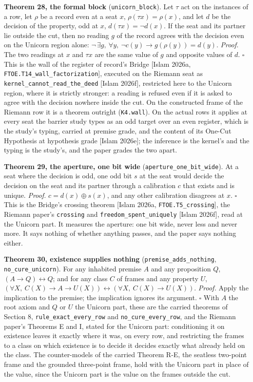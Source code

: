 \documentclass[10pt,twocolumn]{article}
\begin{document}
\textbf{Theorem 28, the formal block} (\texttt{unicorn\_block}). Let
\(\tau\) act on the instances of a row, let \(\rho\) be a record even at
a seat \(x\), \(\rho(\tau x) = \rho(x)\), and let \(d\) be the decision
of the property, odd at \(x\), \(d(\tau x) = \neg d(x)\). If the seat
and its partner lie outside the cut, then no reading \(g\) of the record
agrees with the decision even on the Unicorn region alone:
\(\neg\,\exists g,\ \forall y,\ \neg c(y) \to g(\rho(y)) = d(y)\).
\emph{Proof.} The two readings at \(x\) and \(\tau x\) are the same
value of \(g\) and opposite values of \(d\). \(\square\) This is the
wall of the register of record's Bridge {[}Islam 2026a,
\texttt{FTOE.T14\_wall\_factorization}{]}, executed on the Riemann seat
as \texttt{kernel\_cannot\_read\_the\_deed} {[}Islam 2026f{]},
restricted here to the Unicorn region, where it is strictly stronger: a
reading is refused even if it is asked to agree with the decision
nowhere inside the cut. On the constructed frame of the Riemann row it
is a theorem outright (\texttt{K4.wall}). On the actual rows it applies
at every seat the barrier study types as an odd target over an even
register, which is the study's typing, carried at premise grade, and the
content of its One-Cut Hypothesis at hypothesis grade {[}Islam 2026e{]};
the inference is the kernel's and the typing is the study's, and the
paper grades the two apart.

\textbf{Theorem 29, the aperture, one bit wide}
(\texttt{aperture\_one\_bit\_wide}). At a seat where the decision is
odd, one odd bit \(s\) at the seat would decide the decision on the seat
and its partner through a calibration \(c\) that exists and is unique.
\emph{Proof.} \(c = d(x) \oplus s(x)\), and any other calibration
disagrees at \(x\). \(\square\) This is the Bridge's crossing theorem
{[}Islam 2026a, \texttt{FTOE.T5\_crossing}{]}, the Riemann paper's
\texttt{crossing} and \texttt{freedom\_spent\_uniquely} {[}Islam
2026f{]}, read at the Unicorn part. It measures the aperture: one bit
wide, never less and never more. It says nothing of whether anything
passes, and the paper says nothing either.

\textbf{Theorem 30, existence supplies nothing}
(\texttt{premise\_adds\_nothing}, \texttt{no\_cure\_unicorn}). For any
inhabited premise \(A\) and any proposition \(Q\),
\((A \to Q) \leftrightarrow Q\); and for any class \(C\) of frames and
any property \(U\),
\((\forall X,\ C(X) \to A \to U(X)) \leftrightarrow (\forall X,\ C(X) \to U(X))\).
\emph{Proof.} Apply the implication to the premise; the implication
ignores its argument. \(\square\) With \(A\) the root axiom and \(Q\) or
\(U\) the Unicorn part, these are the carried theorems of Section 8,
\texttt{rule\_exact\_every\_row} and \texttt{no\_cure\_every\_row}, and
the Riemann paper's Theorems E and I, stated for the Unicorn part:
conditioning it on existence leaves it exactly where it was, on every
row, and restricting the frames to a class on which existence is to
decide it decides exactly what already held on the class. The
counter-models of the carried Theorem R-E, the seatless two-point frame
and the grounded three-point frame, hold with the Unicorn part in place
of the value, since the Unicorn part is the value on the frames outside
the cut.
\end{document}
